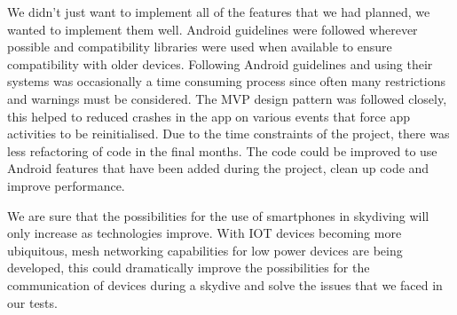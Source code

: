 We didn't just want to implement all of the features that we had planned, we wanted to implement them well. Android guidelines were followed wherever possible and compatibility libraries were used when available to ensure compatibility with older devices. Following Android guidelines and using their systems was occasionally a time consuming process since often many restrictions and warnings must be considered. The MVP design pattern was followed closely, this helped to reduced crashes in the app on various events that force app activities to be reinitialised. Due to the time constraints of the project, there was less refactoring of code in the final months. The code could be improved to use Android features that have been added during the project, clean up code and improve performance.

We are sure that the possibilities for the use of smartphones in skydiving will only increase as technologies improve. With IOT devices becoming more ubiquitous, mesh networking capabilities for low power devices are being developed, this could dramatically improve the possibilities for the communication of devices during a skydive and solve the issues that we faced in our tests.
